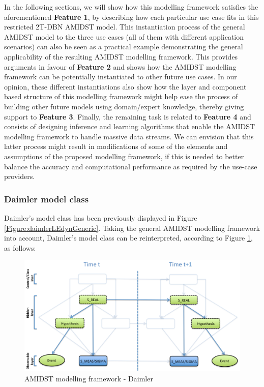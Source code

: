 In the following sections, we will show how this modelling framework satisfies the aforementioned \textbf{Feature 1}, by
describing how each particular use case fits in this restricted 2T-DBN AMIDST model. This instantiation process of the
general AMIDST model to the three use cases (all of them with different application scenarios) can also be seen as a
practical example demonstrating the general applicability of the resulting AMIDST modelling framework. This provides
arguments in favour of \textbf{Feature 2} and shows how the AMIDST modelling framework can be potentially instantiated
to other future use cases. In our opinion, these different instantiations also show how the layer and component based
structure of this modelling framework might help ease the process of building other future models using domain/expert
knowledge, thereby giving support to \textbf{Feature 3}. Finally, the remaining task is related to
\textbf{Feature 4} and consists of designing inference and learning algorithms that enable the AMIDST
modelling framework to handle massive data streams. We can envision that this latter process might result in
modifications of some of the elements and assumptions of the proposed modelling framework, if this is needed to better balance the accuracy and
computational performance as required by the use-case providers.  



\subsubsection{Daimler model class}\label{daimlerAMIDSTModels}

Daimler's model class has been previously displayed in Figure \ref{Figure:daimlerLEdynGeneric}. Taking the general AMIDST modelling framework into account, Daimler's model class can be reinterpreted, according to Figure \ref{Figure:AMIDSTModelClassDaimler}, as follows:

\begin{figure}[ht!]
\begin{center}
\includegraphics[scale=0.39]{./figures/AMIDSTModelClassDaimler}
\caption{\label{Figure:AMIDSTModelClassDaimler} AMIDST modelling framework - Daimler}
\end{center}
\end{figure}

